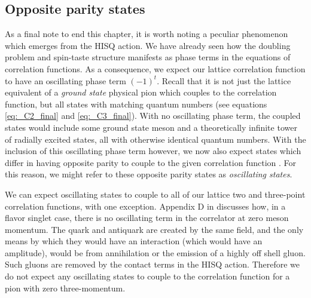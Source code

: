 \subsection{Opposite parity states}\label{sec:opposite_parity}
As a final note to end this chapter, it is worth noting a peculiar phenomenon which emerges from the HISQ action.  We have already seen how the doubling problem and spin-taste structure manifests as phase terms in the equations of correlation functions.  As a consequence, we expect our lattice correlation function to have an oscillating phase term $(-1)^t$.  Recall that it is not just the lattice equivalent of a \textit{ground state} physical pion which couples to the correlation function, but all states with matching quantum numbers (see equations \ref{eq:_C2_final} and \ref{eq:_C3_final}).  With no oscillating phase term, the coupled states would include some ground state meson and a theoretically infinite tower of radially excited states, all with otherwise identical quantum numbers.  With the inclusion of this oscillating phase term however, we now also expect states which differ in having opposite parity to couple to the given correlation function \cite{PhysRevD.67.054505}. For this reason, we might refer to these opposite parity states as \textit{oscillating states}.

We can expect oscillating states to couple to all of our lattice two and three-point correlation functions, with one exception.  Appendix D in \cite{HISQ:2006rc} discusses how, in a flavor singlet case, there is no oscillating term in the correlator at zero meson momentum.  The quark and antiquark are created by the same field, and the only means by which they would have an interaction (which would have an amplitude), would be from annihilation or the emission of a highly off shell gluon.  Such gluons are removed by the contact terms in the HISQ action.  Therefore we do not expect any oscillating states to couple to the correlation function for a pion with zero three-momentum.
